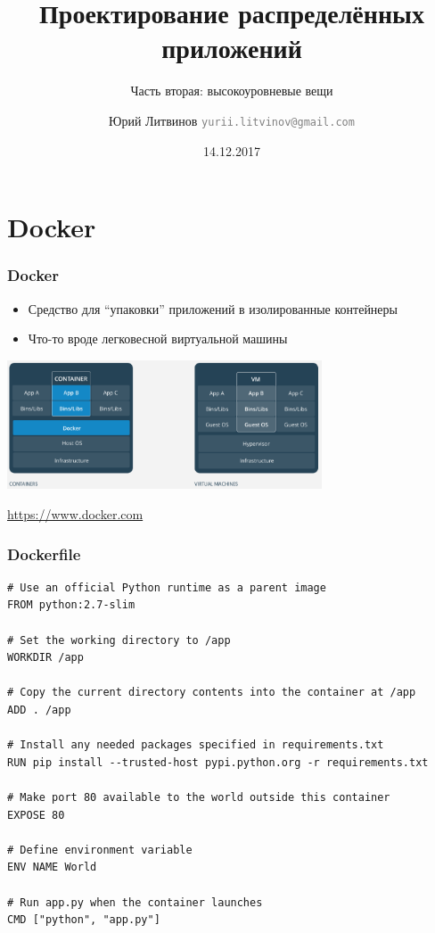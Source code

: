 \documentclass[xetex,mathserif,serif]{beamer}
\title{Проектирование распределённых приложений}
\subtitle{Часть вторая: высокоуровневые вещи}
\author[Юрий Литвинов]{Юрий Литвинов \newline \textcolor{gray}{\small\texttt{yurii.litvinov@gmail.com}}}
\date{14.12.2017}
\newcommand{\attribution}[1] {
	\begin{flushright}\begin{scriptsize}\textcolor{gray}{\textcopyright\; #1}\end{scriptsize}\end{flushright}
}
\begin{document}
	
	\frame{\titlepage}

	\section{Docker}

	\begin{frame}
		\frametitle{Docker}
		\begin{itemize}
			\item Средство для ``упаковки'' приложений в изолированные контейнеры
			\item Что-то вроде легковесной виртуальной машины
		\end{itemize}
		\begin{center}
			\includegraphics[width=0.7\textwidth]{docker.png}
			\attribution{\url{https://www.docker.com}}
		\end{center}
	\end{frame}
	
	\begin{frame}[fragile]
		\frametitle{Dockerfile}
		\begin{scriptsize}
			\begin{verbatim}
# Use an official Python runtime as a parent image
FROM python:2.7-slim

# Set the working directory to /app
WORKDIR /app

# Copy the current directory contents into the container at /app
ADD . /app

# Install any needed packages specified in requirements.txt
RUN pip install --trusted-host pypi.python.org -r requirements.txt

# Make port 80 available to the world outside this container
EXPOSE 80

# Define environment variable
ENV NAME World

# Run app.py when the container launches
CMD ["python", "app.py"]
			\end{verbatim}
		\end{scriptsize}
	\end{frame}
\end{document}
